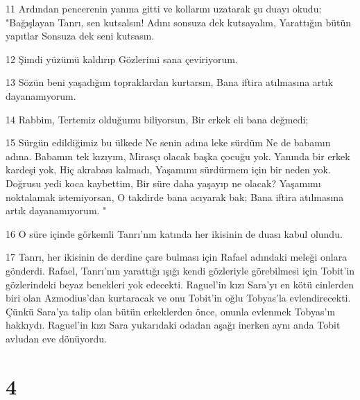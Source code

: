 \par 11 Ardından pencerenin yanına gitti ve kollarını uzatarak şu duayı okudu: "Bağışlayan Tanrı, sen kutsalsın! Adını sonsuza dek kutsayalım, Yarattığın bütün yapıtlar Sonsuza dek seni kutsasın.
\par 12 Şimdi yüzümü kaldırıp Gözlerimi sana çeviriyorum.
\par 13 Sözün beni yaşadığım topraklardan kurtarsın, Bana iftira atılmasına artık dayanamıyorum.
\par 14 Rabbim, Tertemiz olduğumu biliyorsun, Bir erkek eli bana değmedi;
\par 15 Sürgün edildiğimiz bu ülkede Ne senin adına leke sürdüm Ne de babamın adına. Babamın tek kızıyım, Mirasçı olacak başka çocuğu yok. Yanında bir erkek kardeşi yok, Hiç akrabası kalmadı, Yaşamımı sürdürmem için bir neden yok. Doğrusu yedi koca kaybettim, Bir süre daha yaşayıp ne olacak? Yaşamımı noktalamak istemiyorsan, O takdirde bana acıyarak bak; Bana iftira atılmasına artık dayanamıyorum. "
\par 16 O süre içinde görkemli Tanrı'nın katında her ikisinin de duası kabul olundu.
\par 17 Tanrı, her ikisinin de derdine çare bulması için Rafael adındaki meleği onlara gönderdi. Rafael, Tanrı'nın yarattığı ışığı kendi gözleriyle görebilmesi için Tobit'in gözlerindeki beyaz benekleri yok edecekti. Raguel'in kızı Sara'yı en kötü cinlerden biri olan Azmodius'dan kurtaracak ve onu Tobit'in oğlu Tobyas'la evlendirecekti. Çünkü Sara'ya talip olan bütün erkeklerden önce, onunla evlenmek Tobyas'ın hakkıydı. Raguel'in kızı Sara yukarıdaki odadan aşağı inerken aynı anda Tobit avludan eve dönüyordu.

\chapter{4}


